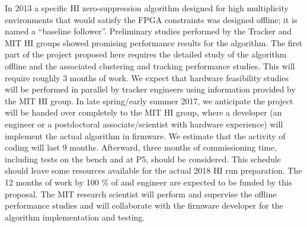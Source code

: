 In 2013 a specific HI zero-suppression algorithm designed for high multiplicity environments that would satisfy the FPGA constraints was designed offline; it is named a ``baseline follower''.  Preliminary studies performed by the Tracker and MIT HI groups showed promising performance results for the algorithm. The first part of the project proposed here requires the detailed study of the algorithm offline and the associated  clustering and tracking performance studies. This will require roughly 3 months of work. We expect that hardware feasibility studies will be performed in parallel by tracker engineers using information provided by the MIT HI group. In late spring/early summer 2017, we anticipate the project will be handed over completely to the MIT HI group, where a developer (an engineer or a postdoctoral associate/scientist with hardware experience) will implement the actual algorithm in firmware. We estimate that the activity of coding will last 9 months. Afterward, three months of commissioning time, including tests on the bench and at P5, should be considered. This schedule should leave some resources available for the actual 2018 HI run preparation. The 12 months of work by 100 \% of and engineer are expected to be funded by this proposal. %
The MIT research scientist will perform and supervise the offline performance studies and will collaborate with the firmware developer for the algorithm implementation and testing.  

